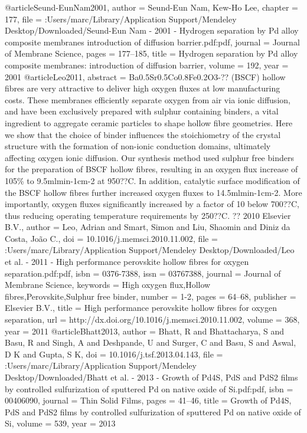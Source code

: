 @article{Seund-EunNam2001,
author = {{Seund-Eun Nam}, Kew-Ho Lee},
chapter = {177},
file = {:Users/marc/Library/Application Support/Mendeley Desktop/Downloaded/Seund-Eun Nam - 2001 - Hydrogen separation by Pd alloy composite membranes introduction of diffusion barrier.pdf:pdf},
journal = {Journal of Membrane Science},
pages = {177--185},
title = {{Hydrogen separation by Pd alloy composite membranes: introduction of diffusion barrier}},
volume = {192},
year = {2001}
}
@article{Leo2011,
abstract = {Ba0.5Sr0.5Co0.8Fe0.2O3-?? (BSCF) hollow fibres are very attractive to deliver high oxygen fluxes at low manufacturing costs. These membranes efficiently separate oxygen from air via ionic diffusion, and have been exclusively prepared with sulphur containing binders, a vital ingredient to aggregate ceramic particles to shape hollow fibre geometries. Here we show that the choice of binder influences the stoichiometry of the crystal structure with the formation of non-ionic conduction domains, ultimately affecting oxygen ionic diffusion. Our synthesis method used sulphur free binders for the preparation of BSCF hollow fibres, resulting in an oxygen flux increase of 105{\%} to 9.5mlmin-1cm-2 at 950??C. In addition, catalytic surface modification of the BSCF hollow fibres further increased oxygen fluxes to 14.5mlmin-1cm-2. More importantly, oxygen fluxes significantly increased by a factor of 10 below 700??C, thus reducing operating temperature requirements by 250??C. ?? 2010 Elsevier B.V.},
author = {Leo, Adrian and Smart, Simon and Liu, Shaomin and {Diniz da Costa}, Jo{\~{a}}o C.},
doi = {10.1016/j.memsci.2010.11.002},
file = {:Users/marc/Library/Application Support/Mendeley Desktop/Downloaded/Leo et al. - 2011 - High performance perovskite hollow fibres for oxygen separation.pdf:pdf},
isbn = {0376-7388},
issn = {03767388},
journal = {Journal of Membrane Science},
keywords = {High oxygen flux,Hollow fibres,Perovskite,Sulphur free binder},
number = {1-2},
pages = {64--68},
publisher = {Elsevier B.V.},
title = {{High performance perovskite hollow fibres for oxygen separation}},
url = {http://dx.doi.org/10.1016/j.memsci.2010.11.002},
volume = {368},
year = {2011}
}
@article{Bhatt2013,
author = {Bhatt, R and Bhattacharya, S and Basu, R and Singh, A and Deshpande, U and Surger, C and Basu, S and Aswal, D K and Gupta, S K},
doi = {10.1016/j.tsf.2013.04.143},
file = {:Users/marc/Library/Application Support/Mendeley Desktop/Downloaded/Bhatt et al. - 2013 - Growth of Pd4S, PdS and PdS2 films by controlled sulfurization of sputtered Pd on native oxide of Si.pdf:pdf},
isbn = {00406090},
journal = {Thin Solid Films},
pages = {41--46},
title = {{Growth of Pd4S, PdS and PdS2 films by controlled sulfurization of sputtered Pd on native oxide of Si}},
volume = {539},
year = {2013}
}
